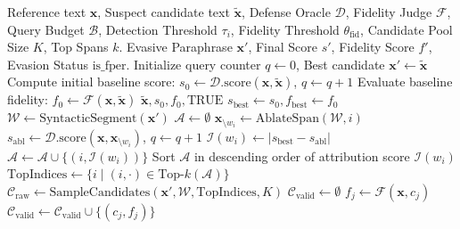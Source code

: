 \documentclass[conference,onecolumn,11pt]{IEEEtran}
\begin{document}
\begin{algorithm}[htbp]
\caption{Tier 2 Saliency-Guided Adaptive Paraphrase Attack with Dual-Judge Fidelity Gating}
\label{alg:saliency_attack}
\begin{algorithmic}[1]
\REQUIRE Reference text $\mathbf{x}$, Suspect candidate text $\mathbf{\tilde{x}}$, Defense Oracle $\mathcal{D}$, Fidelity Judge $\mathcal{F}$, Query Budget $\mathcal{B}$, Detection Threshold $\tau_i$, Fidelity Threshold $\theta_{\text{fid}}$, Candidate Pool Size $K$, Top Spans $k$.
\ENSURE Evasive Paraphrase $\mathbf{x}'$, Final Score $s'$, Fidelity Score $f'$, Evasion Status $\text{is\_fper}$.
\STATE Initialize query counter $q \leftarrow 0$, Best candidate $\mathbf{x}' \leftarrow \mathbf{\tilde{x}}$
\STATE Compute initial baseline score: $s_0 \leftarrow \mathcal{D}.\text{score}(\mathbf{x}, \mathbf{\tilde{x}})$, $q \leftarrow q + 1$
\STATE Evaluate baseline fidelity: $f_0 \leftarrow \mathcal{F}(\mathbf{x}, \mathbf{\tilde{x}})$
    \RETURN $\mathbf{\tilde{x}}, s_0, f_0, \text{TRUE}$
\ENDIF
\STATE $s_{\text{best}} \leftarrow s_0, f_{\text{best}} \leftarrow f_0$
    \STATE $\mathcal{W} \leftarrow \text{SyntacticSegment}(\mathbf{x}')$ 
    \STATE $\mathcal{A} \leftarrow \emptyset$ 
         \BREAK \ENDIF
        \STATE $\mathbf{x}_{\setminus w_i} \leftarrow \text{AblateSpan}(\mathcal{W}, i)$
        \STATE $s_{\text{abl}} \leftarrow \mathcal{D}.\text{score}(\mathbf{x}, \mathbf{x}_{\setminus w_i})$, $q \leftarrow q + 1$
        \STATE $\mathcal{I}(w_i) \leftarrow |s_{\text{best}} - s_{\text{abl}}|$
        \STATE $\mathcal{A} \leftarrow \mathcal{A} \cup \{(i, \mathcal{I}(w_i))\}$
    \ENDFOR
    \STATE Sort $\mathcal{A}$ in descending order of attribution score $\mathcal{I}(w_i)$
    \STATE $\text{TopIndices} \leftarrow \{i \mid (i, \cdot) \in \text{Top-}k(\mathcal{A})\}$
    \STATE $\mathcal{C}_{\text{raw}} \leftarrow \text{SampleCandidates}(\mathbf{x}', \mathcal{W}, \text{TopIndices}, K)$
    \STATE $\mathcal{C}_{\text{valid}} \leftarrow \emptyset$
        \STATE $f_j \leftarrow \mathcal{F}(\mathbf{x}, c_j)$
            \STATE $\mathcal{C}_{\text{valid}} \leftarrow \mathcal{C}_{\text{valid}} \cup \{(c_j, f_j)\}$
        \ENDIF
    \ENDFOR

\end{algorithmic}
\end{algorithm}
\end{document}
